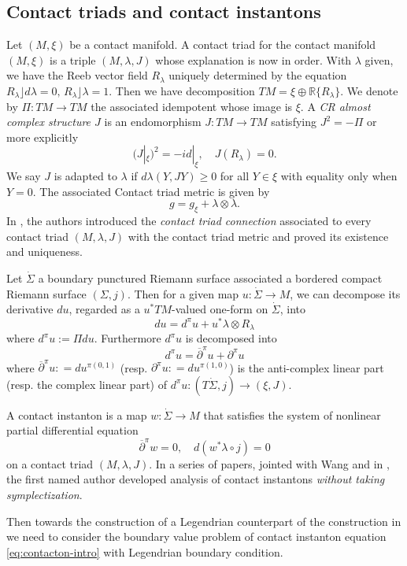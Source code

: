 \documentclass[reqno]{amsart}
\def\R{\ifmmode{\mathbb R}\else{$\mathbb R$}\fi} %
\newcommand{\del}{\partial}
\newcommand{\be}{\begin{equation}}
\newcommand{\ee}{\end{equation}}
\theoremstyle{theorem}
\theoremstyle{definition}
\numberwithin{equation}{section}
\def\R{{\mathbb R}}
\def\R{{\mathbb R}}
\def\delbar{{\overline \partial}}
\def\R{\ifmmode{\mathbb R}\else{$\mathbb R$}\fi} %
\def\R{{\mathbb R}}
\def\R{{\mathbb R}}
\def\delbar{{\overline \partial}}
\begin{document}
\subsection{Contact triads and contact instantons}

Let $(M, \xi)$ be a contact manifold.
A contact triad for the contact manifold $(M, \xi)$ is a triple $(M,\lambda, J)$
whose explanation is now in order. With $\lambda$ given, we have the Reeb vector field $R_\lambda$
uniquely determined by the equation $R_\lambda \rfloor d\lambda = 0, \, R_\lambda \rfloor \lambda = 1$.
Then we have decomposition $TM = \xi \oplus \R \{R_\lambda\}$. We denote by $\Pi: TM \to TM$
the associated idempotent whose image is $\xi$.
A \emph{CR almost complex structure $J$} is an endomorphism $J: TM \to TM$ satisfying $J^2 = - \Pi$
or more explicitly
$$
(J|_\xi)^2 = - id|_\xi, \quad J(R_\lambda) = 0.
$$
We say $J$ is adapted to $\lambda$ if $d\lambda(Y, J Y) \geq 0$ for all $Y \in \xi$ with
equality only when $Y = 0$. The associated Contact triad metric is given by
$$
g=g_\xi+\lambda\otimes\lambda.
$$
In \cite{oh-wang:connection}, the authors introduced the \emph{contact triad connection} associated to
every contact triad $(M, \lambda, J)$ with the contact triad metric and proved its existence and uniqueness.


Let $\dot \Sigma$ a boundary punctured Riemann surface associated a bordered compact Riemann surface
$(\Sigma, j)$. Then for a given map $u: \dot \Sigma \to M$, we can decompose its derivative
$du$, regarded as a $u^*TM$-valued one-form on $\dot \Sigma$, into
\be\label{eq:du}
du = d^\pi u + u^*\lambda \otimes R_\lambda
\ee
 where $d^\pi u := \Pi du$. Furthermore $d^\pi u$ is decomposed into
\be\label{eq:dpiu}
d^\pi u = \delbar^\pi u + \del^\pi u
\ee
where $\delbar^\pi u: = du^{\pi(0,1)}$ (resp. $\del^\pi u: = du^{\pi(1,0)}$) is
the anti-complex linear part (resp. the complex linear part) of $d^\pi u: (T\dot \Sigma, j) \to (\xi,J)$.

A contact instanton is
a map $w: \dot \Sigma \to M$ that satisfies the system of nonlinear partial differential equation
\be\label{eq:contacton-intro}
\delbar^\pi w = 0, \quad d(w^*\lambda \circ j) = 0
\ee
on a contact triad $(M,\lambda, J)$. In a series of papers,
\cite{oh-wang:CR-map1,oh-wang:CR-map2} jointed with Wang and in \cite{oh:contacton}, the first named author developed analysis of
contact instantons \emph{without taking symplectization}.

Then towards the construction of a Legendrian counterpart of the construction in \cite{oh:jdg,oh:cag}
we need to consider the boundary value problem of contact instanton equation \eqref{eq:contacton-intro}
with Legendrian boundary condition.
\end{document}
